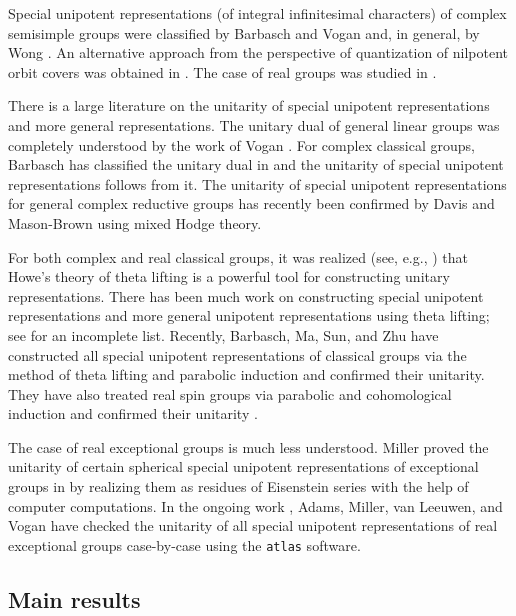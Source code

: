 \documentclass[11pt, a4paper]{amsart}
\theoremstyle{definition}
\numberwithin{equation}{section}
\begin{document}
Special unipotent representations (of integral infinitesimal characters) of complex semisimple groups were classified by Barbasch and Vogan \cite{BV85:unipotent} and, in general, by Wong \cite{Wong:Richardson}. An alternative approach from the perspective of quantization of nilpotent orbit covers was obtained in \cite{LMBM}. The case of real groups was studied in \cite{ABV}. 

There is a large literature on the unitarity of special unipotent representations and more general representations. The unitary dual of general linear groups was completely understood by the work of Vogan \cite{Vogan:unitary_dual_GL}. For complex classical groups, Barbasch has classified the unitary dual in \cite{Barbasch:unitary_dual_complex_classical} and the unitarity of special unipotent representations follows from it. The unitarity of special unipotent representations for general complex reductive groups has recently been confirmed by Davis and Mason-Brown \cite{DMB-Hodge} using mixed Hodge theory.

For both complex and real classical groups, it was realized (see, e.g., \cite{Howe82, Li}) that Howe's theory of theta lifting \cite{Howe79, Howe89} is a powerful tool for constructing unitary representations. There has been much work on constructing special unipotent representations and more general unipotent representations using theta lifting; see \cite{Sahi, Przebinda91, Przebinda93, HuangZhu, HuangLi, Brylinski, He, Trapa, PaulTrapa, Barbasch:unipotent_dual_pair, Moeglin:unipotent_Howe, BarbaschWong:normality} for an incomplete list. 
Recently, Barbasch, Ma, Sun, and Zhu have constructed all special unipotent representations of classical groups via the method of theta lifting and parabolic induction \cite{BMSZ:counting, BMSZ:construction_unitarity} and confirmed their unitarity. They have also treated real spin groups via parabolic and cohomological induction and confirmed their unitarity \cite{BMSZ:spin}. 

The case of real exceptional groups is much less understood. Miller proved the unitarity of certain spherical special unipotent representations of exceptional groups in \cite{Miller} by realizing them as residues of Eisenstein series with the help of computer computations.
In the ongoing work \cite{AMVV}, Adams, Miller, van Leeuwen, and Vogan have checked the unitarity of all special unipotent representations of real exceptional groups case-by-case using the \texttt{atlas} software. 

\subsection{Main results} \label{subsec:main_results}
\end{document}
